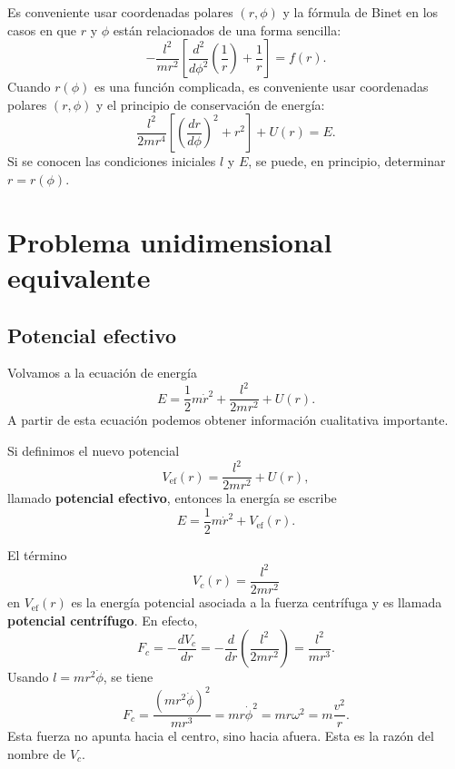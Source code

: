 \documentclass[../apunte_mecanica_clasica.tex]{subfiles}%
\begin{document}
Es conveniente usar coordenadas polares $(r,\phi)$ y la fórmula de Binet en los casos en que $r$ y $\phi$ están relacionados de una forma sencilla:
\begin{equation}
    -\frac{l^2}{mr^2}\left[\frac{d^2}{d\phi^2}\left(\frac{1}{r}\right)+\frac{1}{r}\right]=f(r).
    \label{eq:fcbk-binet-uso-practico}
\end{equation}
Cuando $r(\phi)$ es una función complicada, es conveniente usar coordenadas polares $(r,\phi)$ y el principio de conservación de energía:
\begin{equation}
    \frac{l^2}{2mr^4}\left[\left(\frac{dr}{d\phi}\right)^2+r^2\right]+U(r)=E.
    \label{eq:fcbk-energia-r-de-phi}
\end{equation}
Si se conocen las condiciones iniciales $l$ y $E$, se puede, en principio, determinar $r=r(\phi)$.

\newpage
\section{Problema unidimensional equivalente}

\subsection{Potencial efectivo}

Volvamos a la ecuación de energía
\begin{equation}
    E=\frac{1}{2}m\dot r^2+\frac{l^2}{2mr^2}+U(r).
    \label{eq:fcbk-energia-para-potencial-efectivo}
\end{equation}
A partir de esta ecuación podemos obtener información cualitativa importante.

Si definimos el nuevo potencial
\begin{equation}
    V_{\mathrm{ef}}(r)=\frac{l^2}{2mr^2}+U(r),
    \label{eq:fcbk-potencial-efectivo}
\end{equation}
llamado \textbf{potencial efectivo}, entonces la energía se escribe
\begin{equation}
    E=\frac{1}{2}m\dot r^2+V_{\mathrm{ef}}(r).
    \label{eq:fcbk-energia-potencial-efectivo}
\end{equation}

El término
\begin{equation}
    V_c(r)=\frac{l^2}{2mr^2}
    \label{eq:fcbk-potencial-centrifugo}
\end{equation}
en $V_{\mathrm{ef}}(r)$ es la energía potencial asociada a la fuerza centrífuga y es llamada \textbf{potencial centrífugo}. En efecto,
\begin{equation}
    F_c=-\frac{dV_c}{dr}
    =-\frac{d}{dr}\left(\frac{l^2}{2mr^2}\right)
    =\frac{l^2}{mr^3}.
    \label{eq:fcbk-fuerza-centrifuga-potencial}
\end{equation}
Usando $l=mr^2\dot\phi$, se tiene
\begin{equation}
    F_c=\frac{(mr^2\dot\phi)^2}{mr^3}=mr\dot\phi^2=mr\omega^2=m\frac{v^2}{r}.
    \label{eq:fcbk-fuerza-centrifuga-formas}
\end{equation}
Esta fuerza no apunta hacia el centro, sino hacia afuera. Esta es la razón del nombre de $V_c$.
\end{document}
